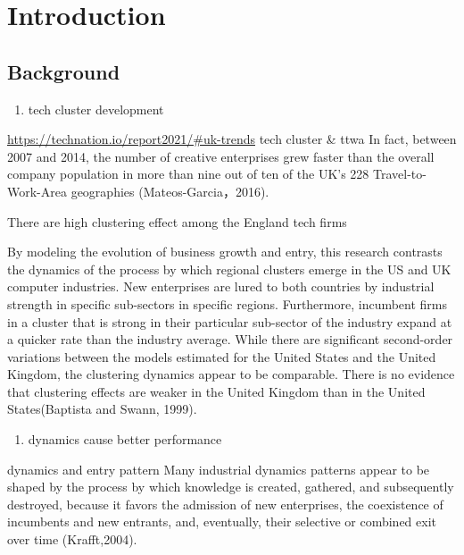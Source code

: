 \documentclass[
  12pt,
  oneside]{book}
\providecommand{\tightlist}{%
  \setlength{\itemsep}{0pt}\setlength{\parskip}{0pt}}
\begin{document}
\hypertarget{introduction}{%
\chapter{Introduction}\label{introduction}}


\hypertarget{background}{%
\section{Background}\label{background}}

\begin{enumerate}
\def\labelenumi{\arabic{enumi}.}
\tightlist
\item
  tech cluster development
\end{enumerate}

\url{https://technation.io/report2021/\#uk-trends}
tech cluster \& ttwa
In fact, between 2007 and 2014, the number of creative enterprises grew faster than the overall company population in more than nine out of ten of the UK's 228 Travel-to-Work-Area geographies (Mateos-Garcia，2016).

There are high clustering effect among the England tech firms

By modeling the evolution of business growth and entry, this research contrasts the dynamics of the process by which regional clusters emerge in the US and UK computer industries. New enterprises are lured to both countries by industrial strength in specific sub-sectors in specific regions. Furthermore, incumbent firms in a cluster that is strong in their particular sub-sector of the industry expand at a quicker rate than the industry average. While there are significant second-order variations between the models estimated for the United States and the United Kingdom, the clustering dynamics appear to be comparable. There is no evidence that clustering effects are weaker in the United Kingdom than in the United States(Baptista and Swann, 1999).

\begin{enumerate}
\def\labelenumi{\arabic{enumi}.}
\setcounter{enumi}{1}
\tightlist
\item
  dynamics cause better performance
\end{enumerate}

dynamics and entry pattern
Many industrial dynamics patterns appear to be shaped by the process by which knowledge is created, gathered, and subsequently destroyed, because it favors the admission of new enterprises, the coexistence of incumbents and new entrants, and, eventually, their selective or combined exit over time (Krafft,2004).
\end{document}
